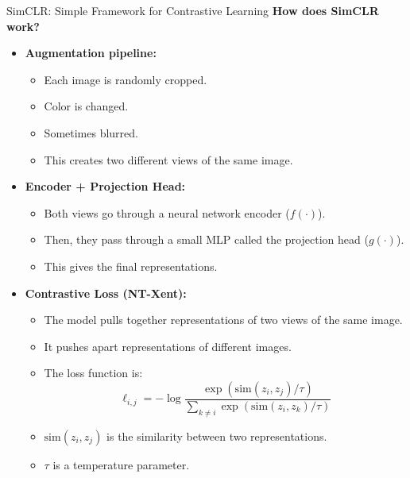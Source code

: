 \begin{frame}[allowframebreaks]{SimCLR: Simple Framework for Contrastive Learning}
\textbf{How does SimCLR work?}
\begin{itemize}
    \item \textbf{Augmentation pipeline:}
        \begin{itemize}
            \item Each image is randomly cropped.
            \item Color is changed.
            \item Sometimes blurred.
            \item This creates two different views of the same image.
        \end{itemize}
    \framebreak
    \item \textbf{Encoder + Projection Head:}
        \begin{itemize}
            \item Both views go through a neural network encoder ($f(\cdot)$).
            \item Then, they pass through a small MLP called the projection head ($g(\cdot)$).
            \item This gives the final representations.
        \end{itemize}
    \framebreak
    \item \textbf{Contrastive Loss (NT-Xent):}
        \begin{itemize}
            \item The model pulls together representations of two views of the same image.
            \item It pushes apart representations of different images.
            \item The loss function is:
            \[
            \ell_{i,j} = -\log \frac{\exp(\text{sim}(z_i, z_j)/\tau)}{\sum_{k \neq i} \exp(\text{sim}(z_i, z_k)/\tau)}
            \]
            \item $\text{sim}(z_i, z_j)$ is the similarity between two representations.
            \item $\tau$ is a temperature parameter.
        \end{itemize}
\end{itemize}

\framebreak


\end{frame}
